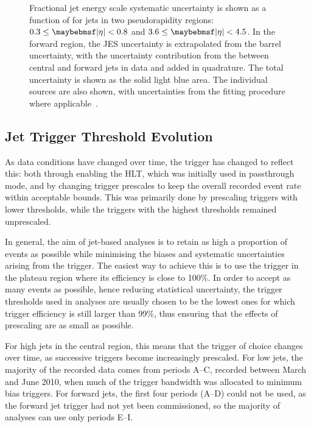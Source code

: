 \begin{figure}[htpb]
{    \label{fig:analysis-tools:JESUncertainty_forward}}
  \caption{Fractional jet energy scale systematic uncertainty is shown as a
           function of \pT for jets in two pseudorapidity regions: \protect{}
           $0.3 \leq \absEta < 0.8$ and \protect{}
           $3.6 \leq \absEta < 4.5$. In the forward region, the JES uncertainty
           is extrapolated from the barrel uncertainty, with the uncertainty contribution
           from the \etaint between central and forward jets in data and \MC added
           in quadrature. The total uncertainty is shown as the solid light blue
           area. The individual sources are also shown, with uncertainties from
           the fitting procedure where applicable~\cite{ATLAS-CONF-2010-056,CERN-PH-EP-2011-191}.}
  \label{fig:analysis-tools:JESUncertainty}
\end{figure}

\subsection{Jet Trigger Threshold Evolution}
\label{sec:analysis-tools:jet_selection_evolution}
As data conditions have changed over time, the trigger has changed to reflect
this: both through enabling the HLT, which was initially used in passthrough
mode, and by changing trigger prescales to keep the overall recorded event rate
within acceptable bounds. This was primarily done by prescaling triggers with
lower \ET thresholds, while the triggers with the highest \ET thresholds
remained unprescaled.

In general, the aim of jet-based analyses is to retain as high a proportion of events as
possible while minimising the biases and systematic uncertainties arising from
the trigger. The easiest way to achieve this is to use the trigger in the
plateau region where its efficiency is close to 100\%. In order to accept as
many events as possible, hence reducing statistical uncertainty, the trigger
thresholds used in analyses are usually chosen to be the lowest ones for which
trigger efficiency is still larger than 99\%, thus ensuring that the effects of
prescaling are as small as possible.

For high \pT jets in the central region, this means that the trigger of choice
changes over time, as successive triggers become increasingly prescaled. For
low \pT jets, the majority of the recorded data comes from periods A--C, recorded
between March and June 2010, when much of the trigger bandwidth was allocated to
minimum bias triggers. For forward jets, the first four periods (A--D) could not
be used, as the forward jet trigger had not yet been commissioned, so the
majority of analyses can use only periods E--I.

